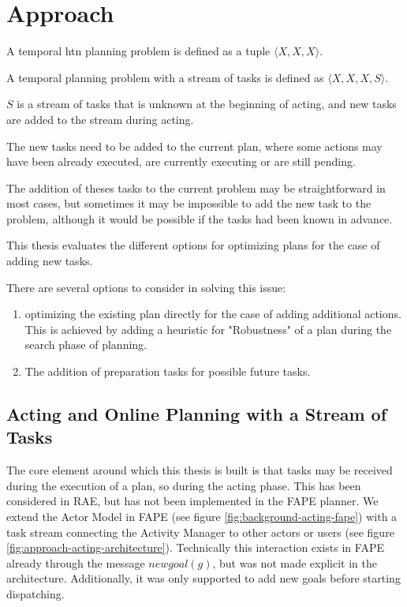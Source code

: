 \section{Approach}\label{sec:approach}


A temporal htn planning problem is defined as a tuple $\langle X,X,X \rangle$.

A temporal planning problem with a stream of tasks is defined as $\langle X,X,X,S \rangle$.

$S$ is a stream of tasks that is unknown at the beginning of acting, and new tasks are added to the stream during acting.

The new tasks need to be added to the current plan, where some actions may have been already executed, are currently executing or are still pending.

The addition of theses tasks to the current problem may be straightforward in most cases, but sometimes it may be impossible to add the new task to the problem, although it would be possible if the tasks had been known in advance.

This thesis evaluates the different options for optimizing plans for the case of adding new tasks.

There are several options to consider in solving this issue:

\begin{enumerate}
    \item optimizing the existing plan directly for the case of adding additional actions. This is achieved by adding a heuristic for "Robustness" of a plan during the search phase of planning.
    \item The addition of preparation tasks for possible future tasks.
\end{enumerate}


\subsection{Acting and Online Planning with a Stream of Tasks}

The core element around which this thesis is built is that tasks may be received during the execution of a plan, so during the acting phase.
This has been considered in RAE, but has not been implemented in the FAPE planner.
We extend the Actor Model in FAPE (see figure \ref{fig:background-acting-fape}) with a task stream connecting the Activity Manager to other actors or users (see figure \ref{fig:approach-acting-architecture}).
Technically this interaction exists in FAPE already through the message $newgoal(g)$, but was not made explicit in the architecture.
Additionally, it was only supported to add new goals before starting dispatching.

